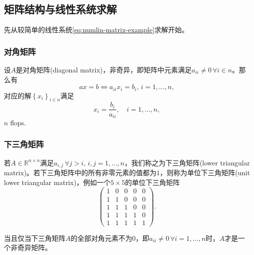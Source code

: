\subsection{矩阵结构与线性系统求解}
\label{sec:numlin-decomposition}

先从较简单的线性系统\eqref{eq:numlin-matrix-example}求解开始。

\subsubsection{对角矩阵}
\label{sec:numlin-matrix-diagonal}
设$A$是对角矩阵(diagonal matrix)，非奇异，即矩阵中元素满足$a_{ii} \neq 0 \, \forall i \in n$。那么有
\begin{equation*}
  a x = b \Leftrightarrow a_{ii} x_{i} = b_{i}, \, i = 1,\ldots,n,
\end{equation*}
对应的解$\left\{ x_{i} \right\}_{i \in n}$满足
\begin{equation*}
  x_{i} = \frac{b_{i}}{a_{ii}}, \quad i=1,\ldots,n,
\end{equation*}
$n$ flops.

\subsubsection{下三角矩阵}
若$A \in \mathbb{R}^{n \times n}$满足$a_{i,j} \, \forall j > i, \, i,j=1,\ldots,n$，我们称之为下三角矩阵(lower triangular matrix)。若下三角矩阵中的所有非零元素的值都为$1$，则称为单位下三角矩阵(unit lower triangular matrix)，例如一个$5 \times 5$的单位下三角矩阵
\begin{equation*}
\begin{pmatrix}
   1 & 0 & 0 & 0 & 0\\
   1 & 1 & 0 & 0 & 0\\
   1 & 1 & 1 & 0 & 0\\
   1 & 1 & 1 & 1 & 0\\
   1 & 1 & 1 & 1 & 1
 \end{pmatrix}.
\end{equation*}

当且仅当下三角矩阵$A$的全部对角元素不为$0$，即$a_{ii} \neq 0 \, \forall i =1,\ldots,n$时，$A$才是一个非奇异矩阵。

